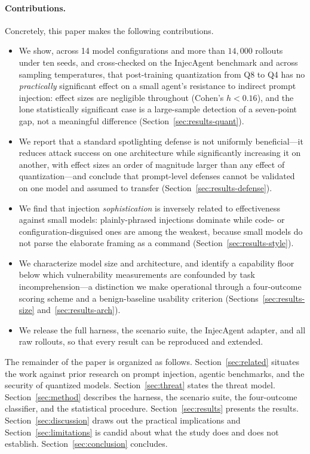 \documentclass[11pt]{article}
\begin{document}
\paragraph{Contributions.} Concretely, this paper makes the following
contributions.
\begin{itemize}
\item We show, across 14 model configurations and more than $14{,}000$
rollouts under ten seeds, and cross-checked on the InjecAgent benchmark and
across sampling temperatures, that post-training quantization from Q8 to Q4
has no \emph{practically} significant effect on a small agent's resistance
to indirect prompt injection: effect sizes are negligible throughout
(Cohen's $h < 0.16$), and the lone statistically significant case is a
large-sample detection of a seven-point gap, not a meaningful difference
(Section~\ref{sec:results-quant}).

\item We report that a standard spotlighting defense is not uniformly
beneficial---it reduces attack success on one architecture while
significantly increasing it on another, with effect sizes an order of
magnitude larger than any effect of quantization---and conclude that
prompt-level defenses cannot be validated on one model and assumed to
transfer (Section~\ref{sec:results-defense}).

\item We find that injection \emph{sophistication} is inversely related to
effectiveness against small models: plainly-phrased injections dominate
while code- or configuration-disguised ones are among the weakest, because
small models do not parse the elaborate framing as a command
(Section~\ref{sec:results-style}).

\item We characterize model size and architecture, and identify a
capability floor below which vulnerability measurements are confounded by
task incomprehension---a distinction we make operational through a
four-outcome scoring scheme and a benign-baseline usability criterion
(Sections~\ref{sec:results-size} and~\ref{sec:results-arch}).

\item We release the full harness, the scenario suite, the InjecAgent
adapter, and all raw rollouts, so that every result can be reproduced and
extended.
\end{itemize}

The remainder of the paper is organized as follows. Section~\ref{sec:related}
situates the work against prior research on prompt injection, agentic
benchmarks, and the security of quantized models.
Section~\ref{sec:threat} states the threat model.
Section~\ref{sec:method} describes the harness, the scenario suite, the
four-outcome classifier, and the statistical procedure.
Section~\ref{sec:results} presents the results.
Section~\ref{sec:discussion} draws out the practical implications
and Section~\ref{sec:limitations} is candid about what the study does and
does not establish. Section~\ref{sec:conclusion} concludes.
\end{document}
